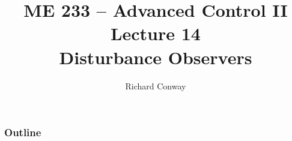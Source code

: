 \documentclass[handout,mathserif]{beamer}       %
\title{ME 233 -- Advanced Control II\\
    Lecture 14 \\
    Disturbance Observers}
\author{Richard Conway}
\institute{UC Berkeley}
\begin{document}
\maketitle

\begin{frame}
    \frametitle{Outline}
    \tableofcontents
\end{frame}






\end{document}
